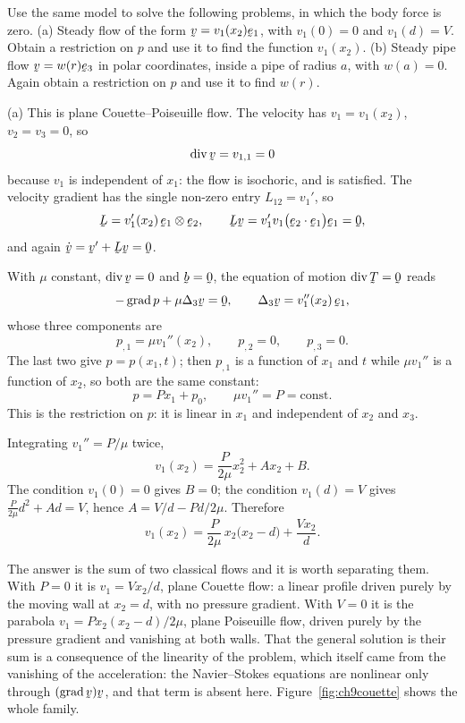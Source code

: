 \begin{problem}
Use the same model to solve the following problems, in which the body
force is zero.
(a) Steady flow of the form $\bv=v_{1}(x_{2})\be_{1}$, with
$v_{1}(0)=0$ and $v_{1}(d)=V$. Obtain a restriction on $p$ and use it to
find the function $v_{1}(x_{2})$.
(b) Steady pipe flow $\bv=w(r)\be_{3}$ in polar coordinates, inside a
pipe of radius $a$, with $w(a)=0$. Again obtain a restriction on $p$ and
use it to find $w(r)$.
\end{problem}

\begin{solution}
(a) This is plane Couette--Poiseuille flow. The velocity has
$v_{1}=v_{1}(x_{2})$, $v_{2}=v_{3}=0$, so
\[
   \dvg\bv=v_{1,1}=0
\]
because $v_{1}$ is independent of $x_{1}$: the flow is isochoric, and
 is satisfied. The velocity gradient has the single non-zero
entry $L_{12}=v_{1}'$, so
\[
   \bL=v_{1}'(x_{2})\,\be_{1}\otimes\be_{2},
   \qquad
   \bL\bv=v_{1}'v_{1}\big(\ip{\be_{2}}{\be_{1}}\big)\be_{1}=\bze ,
\]
and again $\dot\bv=\bv'+\bL\bv=\bze$.

With $\mu$ constant, $\dvg\bv=0$ and $\bb=\bze$, the equation of motion
$\dvg\bT=\bze$ reads
\[
   -\grad p+\mu\Delta_{3}\bv=\bze ,
   \qquad
   \Delta_{3}\bv=v_{1}''(x_{2})\,\be_{1},
\]
whose three components are
\[
   p_{,1}=\mu v_{1}''(x_{2}),\qquad p_{,2}=0,\qquad p_{,3}=0 .
\]
The last two give $p=p(x_{1},t)$; then $p_{,1}$ is a function of
$x_{1}$ and $t$ while $\mu v_{1}''$ is a function of $x_{2}$, so both
are the same constant:
\[
   \boxed{\ p=Px_{1}+p_{0},\qquad
   \mu v_{1}''=P=\text{const}.\ }
\]
This is the restriction on $p$: it is linear in $x_{1}$ and independent
of $x_{2}$ and $x_{3}$.

Integrating $v_{1}''=P/\mu$ twice,
\[
   v_{1}(x_{2})=\frac{P}{2\mu}x_{2}^{2}+Ax_{2}+B .
\]
The condition $v_{1}(0)=0$ gives $B=0$; the condition $v_{1}(d)=V$ gives
$\frac{P}{2\mu}d^{2}+Ad=V$, hence $A=V/d-Pd/2\mu$. Therefore
\[
   \boxed{\ v_{1}(x_{2})=\frac{P}{2\mu}\,x_{2}\big(x_{2}-d\big)
   +\frac{V x_{2}}{d}. \ }
\]

The answer is the sum of two classical flows and it is worth separating
them. With $P=0$ it is $v_{1}=Vx_{2}/d$, plane Couette flow: a
linear profile driven purely by the moving wall at $x_{2}=d$, with no
pressure gradient. With $V=0$ it is the parabola
$v_{1}=Px_{2}(x_{2}-d)/2\mu$, plane Poiseuille flow, driven
purely by the pressure gradient and vanishing at both walls. That the
general solution is their sum is a consequence of the linearity of the
problem, which itself came from the vanishing of the acceleration: the
Navier--Stokes equations are nonlinear only through $(\grad\bv)\bv$, and
that term is absent here. Figure~\ref{fig:ch9couette} shows the whole
family.


\end{solution}

